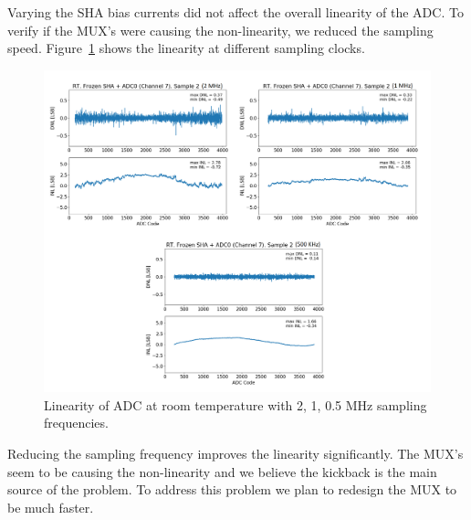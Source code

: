 Varying the SHA bias currents did not affect the overall linearity of the ADC. To verify if the MUX's were causing the non-linearity, we reduced the sampling speed. Figure~\ref{fig:linearity_mux_speed} shows the linearity at different sampling clocks. 
\begin{figure}[h!]
\centering
  \includegraphics[width=1.0\linewidth]{figures/prakash_fig/linearity_mux_speed.png}
  \caption{Linearity of ADC at room temperature with 2, 1, 0.5 MHz sampling frequencies.}
  \label{fig:linearity_mux_speed}
\end{figure}

Reducing the sampling frequency improves the linearity significantly. The MUX's seem to be causing the non-linearity and we believe the kickback is the main source of the problem. To address this problem we plan to redesign the MUX to be much faster.

